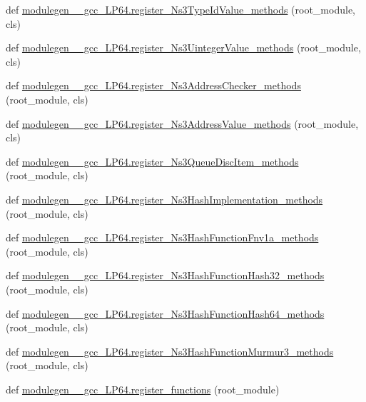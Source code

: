 \begin{DoxyCompactItemize}
\item 
def \hyperlink{namespacemodulegen____gcc__LP64_ab25f30f66f8ae8da64444bac683dac7c}{modulegen\+\_\+\+\_\+gcc\+\_\+\+L\+P64.\+register\+\_\+\+Ns3\+Type\+Id\+Value\+\_\+methods} (root\+\_\+module, cls)
\item 
def \hyperlink{namespacemodulegen____gcc__LP64_a78f03cf0c89b39801a32f427d56d54df}{modulegen\+\_\+\+\_\+gcc\+\_\+\+L\+P64.\+register\+\_\+\+Ns3\+Uinteger\+Value\+\_\+methods} (root\+\_\+module, cls)
\item 
def \hyperlink{namespacemodulegen____gcc__LP64_a89e9f561a2c1e1e454b475d69805122f}{modulegen\+\_\+\+\_\+gcc\+\_\+\+L\+P64.\+register\+\_\+\+Ns3\+Address\+Checker\+\_\+methods} (root\+\_\+module, cls)
\item 
def \hyperlink{namespacemodulegen____gcc__LP64_afbde1a3f3b1b9e58c7c95df3cbbef1ae}{modulegen\+\_\+\+\_\+gcc\+\_\+\+L\+P64.\+register\+\_\+\+Ns3\+Address\+Value\+\_\+methods} (root\+\_\+module, cls)
\item 
def \hyperlink{namespacemodulegen____gcc__LP64_ab13c299879541b828310cc46d877c0b5}{modulegen\+\_\+\+\_\+gcc\+\_\+\+L\+P64.\+register\+\_\+\+Ns3\+Queue\+Disc\+Item\+\_\+methods} (root\+\_\+module, cls)
\item 
def \hyperlink{namespacemodulegen____gcc__LP64_afdc62559dc296b925757fa93e7cd4260}{modulegen\+\_\+\+\_\+gcc\+\_\+\+L\+P64.\+register\+\_\+\+Ns3\+Hash\+Implementation\+\_\+methods} (root\+\_\+module, cls)
\item 
def \hyperlink{namespacemodulegen____gcc__LP64_ae9b88db2dea3c59f886d0be14d039694}{modulegen\+\_\+\+\_\+gcc\+\_\+\+L\+P64.\+register\+\_\+\+Ns3\+Hash\+Function\+Fnv1a\+\_\+methods} (root\+\_\+module, cls)
\item 
def \hyperlink{namespacemodulegen____gcc__LP64_a9e34b1934e0920db80354937fe083ff8}{modulegen\+\_\+\+\_\+gcc\+\_\+\+L\+P64.\+register\+\_\+\+Ns3\+Hash\+Function\+Hash32\+\_\+methods} (root\+\_\+module, cls)
\item 
def \hyperlink{namespacemodulegen____gcc__LP64_a082871bd62d0a4db1581a4a5a90ef0ac}{modulegen\+\_\+\+\_\+gcc\+\_\+\+L\+P64.\+register\+\_\+\+Ns3\+Hash\+Function\+Hash64\+\_\+methods} (root\+\_\+module, cls)
\item 
def \hyperlink{namespacemodulegen____gcc__LP64_adca5cdfc5ab708e8c329dbbc45251f75}{modulegen\+\_\+\+\_\+gcc\+\_\+\+L\+P64.\+register\+\_\+\+Ns3\+Hash\+Function\+Murmur3\+\_\+methods} (root\+\_\+module, cls)
\item 
def \hyperlink{namespacemodulegen____gcc__LP64_aec4a5f753ed5fb80e971fb72341c9052}{modulegen\+\_\+\+\_\+gcc\+\_\+\+L\+P64.\+register\+\_\+functions} (root\+\_\+module)

\end{DoxyCompactItemize}
